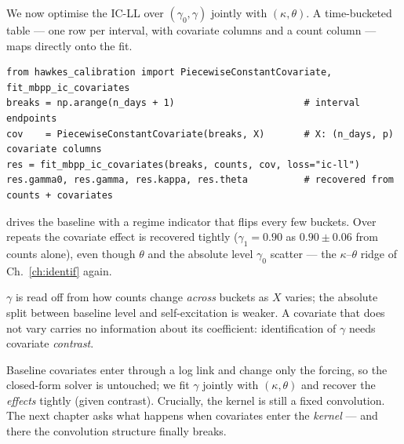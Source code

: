 We now optimise the IC-LL over $(\gamma_0,\gamma)$ jointly with $(\kappa,\theta)$.
A time-bucketed table --- one row per interval, with covariate columns and a count
column --- maps directly onto the fit.

\begin{lstlisting}[caption={Estimating covariate effects from a daily table.}]
from hawkes_calibration import PiecewiseConstantCovariate, fit_mbpp_ic_covariates
breaks = np.arange(n_days + 1)                       # interval endpoints
cov    = PiecewiseConstantCovariate(breaks, X)       # X: (n_days, p) covariate columns
res = fit_mbpp_ic_covariates(breaks, counts, cov, loss="ic-ll")
res.gamma0, res.gamma, res.kappa, res.theta          # recovered from counts + covariates
\end{lstlisting}

\begin{examplebox}
 drives the baseline with a regime indicator that
flips every few buckets. Over repeats the covariate effect is recovered tightly
($\gamma_1=0.90$ as $0.90\pm0.06$ from counts alone), even though $\theta$ and the
absolute level $\gamma_0$ scatter --- the $\kappa$--$\theta$ ridge of
Ch.~\ref{ch:identif} again.
\end{examplebox}

\begin{whybox}
$\gamma$ is read off from how counts change \emph{across} buckets as $X$ varies;
the absolute split between baseline level and self-excitation is weaker. A covariate
that does not vary carries no information about its coefficient: identification of
$\gamma$ needs covariate \emph{contrast}.
\end{whybox}

\begin{recap}
Baseline covariates enter through a log link and change only the forcing, so the
closed-form solver is untouched; we fit $\gamma$ jointly with $(\kappa,\theta)$ and
recover the \emph{effects} tightly (given contrast). Crucially, the kernel is still
a fixed convolution. The next chapter asks what happens when covariates enter the
\emph{kernel} --- and there the convolution structure finally breaks.
\end{recap}

